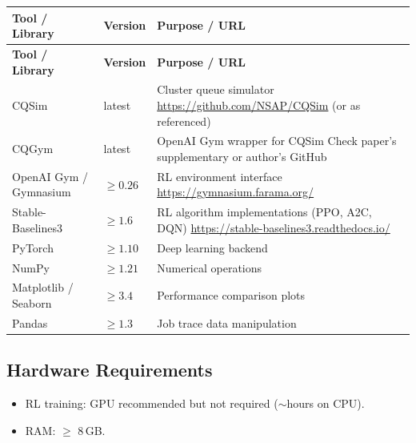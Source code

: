 \documentclass[11pt,a4paper]{article}
\begin{document}
\begin{longtable}{p{4.5cm} p{2.5cm} p{6.5cm}}
\toprule
\textbf{Tool / Library} & \textbf{Version} & \textbf{Purpose / URL} \\
\midrule
\endfirsthead
\toprule
\textbf{Tool / Library} & \textbf{Version} & \textbf{Purpose / URL} \\
\midrule
\endhead
CQSim & latest & Cluster queue simulator \newline \url{https://github.com/NSAP/CQSim} (or as referenced) \\
\midrule
CQGym & latest & OpenAI Gym wrapper for CQSim \newline Check paper's supplementary or author's GitHub \\
\midrule
OpenAI Gym / Gymnasium & $\geq 0.26$ & RL environment interface \newline \url{https://gymnasium.farama.org/} \\
\midrule
Stable-Baselines3 & $\geq 1.6$ & RL algorithm implementations (PPO, A2C, DQN) \newline \url{https://stable-baselines3.readthedocs.io/} \\
\midrule
PyTorch & $\geq 1.10$ & Deep learning backend \\
\midrule
NumPy & $\geq 1.21$ & Numerical operations \\
\midrule
Matplotlib / Seaborn & $\geq 3.4$ & Performance comparison plots \\
\midrule
Pandas & $\geq 1.3$ & Job trace data manipulation \\
\bottomrule
\end{longtable}

\subsection{Hardware Requirements}
\begin{itemize}
  \item RL training: GPU recommended but not required ($\sim$hours on CPU).
  \item RAM: $\geq$ 8\,GB.
\end{itemize}
\end{document}
